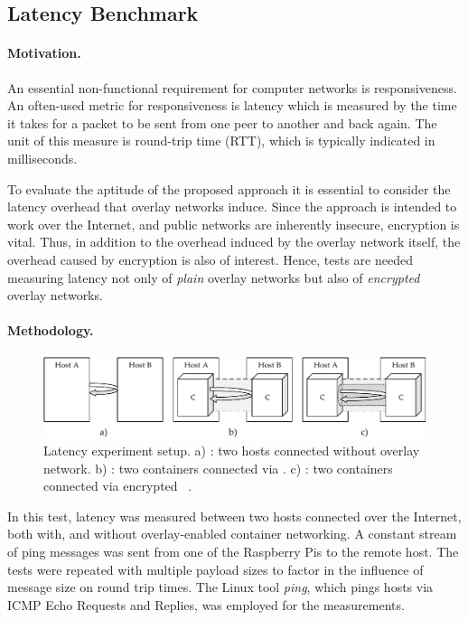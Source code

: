 \subsection{Latency Benchmark} \label{sec:plainlatency}

\paragraph{Motivation.} An essential non-functional requirement for computer networks is responsiveness. An often-used metric for responsiveness is latency which is measured by the time it takes for a packet to be sent from one peer to another and back again. The unit of this measure is round-trip time (RTT), which is typically indicated in milliseconds. 

To evaluate the aptitude of the proposed approach it is essential to consider the latency overhead that overlay networks induce. Since the approach is intended to work over the Internet, and public networks are inherently insecure, encryption is vital. Thus, in addition to the overhead induced by the overlay network itself, the overhead caused by encryption is also of interest. Hence, tests are needed measuring latency not only of \emph{plain} overlay networks but also of \emph{encrypted} overlay networks.


\paragraph{Methodology.} 

\begin{figure}[htpb]
  \centering
  \includegraphics[width=\textwidth]{figures/ping-test}
  \caption[Latency experiment setup]{Latency experiment setup. a) : two hosts connected without overlay network. b) : two containers connected via \wnet . c) : two containers connected via encrypted \wnet\ .}\label{fig:latency-setup}
\end{figure}

In this test, latency was measured between two hosts connected over the Internet, both with, and without overlay-enabled container networking. A constant stream of ping messages was sent from one of the Raspberry Pis to the remote host. The tests were repeated with multiple payload sizes to factor in the influence of message size on round trip times. The Linux tool \emph{ping}, which pings hosts via ICMP Echo Requests and Replies, was employed for the measurements. 

